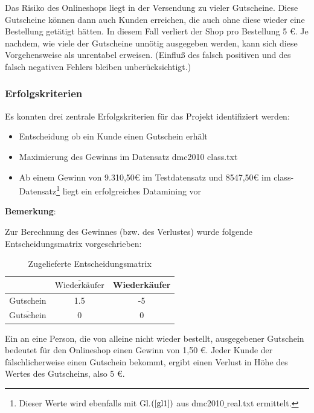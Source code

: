 \documentclass[a4paper,12pt]{article}
\begin{document}
Das Risiko des Onlineshops liegt in der Versendung zu vieler Gutscheine. Diese Gutscheine können dann auch Kunden erreichen, die auch ohne diese wieder eine Bestellung getätigt hätten. In diesem Fall verliert der Shop pro Bestellung 5 \euro. Je nachdem, wie viele der Gutscheine unnötig ausgegeben werden, kann
sich diese Vorgehensweise als unrentabel erweisen. (Einfluß des falsch positiven und des falsch negativen Fehlers bleiben unberücksichtigt.)

\subsubsection{Erfolgskriterien}
Es konnten drei zentrale Erfolgskriterien für das Projekt identifiziert werden:
\begin{itemize}
	\item Entscheidung ob ein Kunde einen Gutschein erhält
	\item Maximierung des Gewinns im Datensatz dmc2010 class.txt
	\item Ab einem Gewinn von 9.310,50\euro\; im Testdatensatz und 8547,50\euro\; im class-Datensatz\footnote{Dieser Werte wird ebenfalls mit Gl.$(\ref{gl1})$  aus dmc2010$\_$real.txt ermittelt.} liegt ein erfolgreiches Datamining vor
\end{itemize}

\textbf{Bemerkung}:
\par
Zur Berechnung des Gewinnes (bzw. des Verlustes) wurde folgende Entscheidungsmatrix vorgeschrieben:

\begin{table}[h]
\begin{center}
\begin{tabular}{c | c | c }
 &$\overline{\text{Wiederkäufer}}$\footnotemark & Wiederkäufer
\\
\hline
Gutschein & 1.5 & -5
\\
$\overline{\text{Gutschein}}$ & 0 & 0
\end{tabular}
\caption{Zugelieferte Entscheidungsmatrix}
\end{center}
\end{table}
Ein an eine Person, die von alleine nicht wieder bestellt, ausgegebener Gutschein bedeutet für den Onlineshop einen Gewinn von 1,50 \euro\;. Jeder Kunde der fälschlicherweise
einen Gutschein bekommt, ergibt einen Verlust in  Höhe des Wertes des Gutscheins, also 5 \euro.
\end{document}
